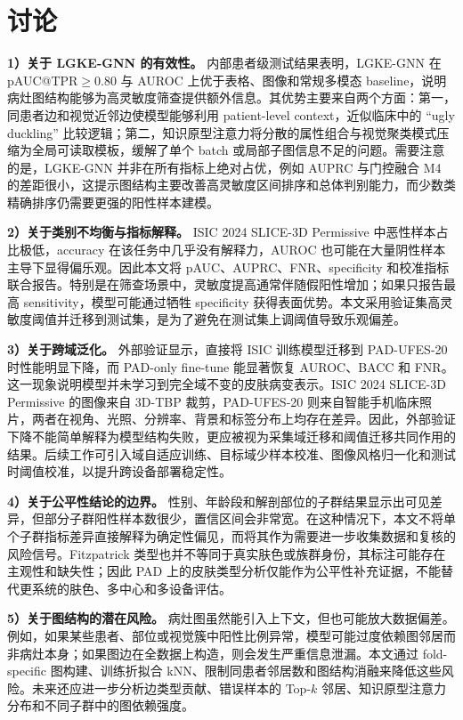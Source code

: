 \documentclass[UTF8,a4paper,10pt,twocolumn,fontset=fandol]{ctexart}
\newcommand{\isic}{ISIC 2024 SLICE-3D Permissive}
\newcommand{\pad}{PAD-UFES-20}
\newcommand{\modelname}{LGKE-GNN}
\begin{document}
\section{讨论}

\textbf{1）关于 LGKE-GNN 的有效性。}
内部患者级测试结果表明，\modelname{} 在 pAUC@TPR$\geq0.80$ 与 AUROC 上优于表格、图像和常规多模态 baseline，说明病灶图结构能够为高灵敏度筛查提供额外信息。其优势主要来自两个方面：第一，同患者边和视觉近邻边使模型能够利用 patient-level context，近似临床中的 ``ugly duckling'' 比较逻辑；第二，知识原型注意力将分散的属性组合与视觉聚类模式压缩为全局可读取模板，缓解了单个 batch 或局部子图信息不足的问题。需要注意的是，\modelname{} 并非在所有指标上绝对占优，例如 AUPRC 与门控融合 M4 的差距很小，这提示图结构主要改善高灵敏度区间排序和总体判别能力，而少数类精确排序仍需要更强的阳性样本建模。

\textbf{2）关于类别不均衡与指标解释。}
\isic{} 中恶性样本占比极低，accuracy 在该任务中几乎没有解释力，AUROC 也可能在大量阴性样本主导下显得偏乐观。因此本文将 pAUC、AUPRC、FNR、specificity 和校准指标联合报告。特别是在筛查场景中，灵敏度提高通常伴随假阳性增加；如果只报告最高 sensitivity，模型可能通过牺牲 specificity 获得表面优势。本文采用验证集高灵敏度阈值并迁移到测试集，是为了避免在测试集上调阈值导致乐观偏差。

\textbf{3）关于跨域泛化。}
外部验证显示，直接将 ISIC 训练模型迁移到 \pad{} 时性能明显下降，而 PAD-only fine-tune 能显著恢复 AUROC、BACC 和 FNR。这一现象说明模型并未学习到完全域不变的皮肤病变表示。\isic{} 的图像来自 3D-TBP 裁剪，\pad{} 则来自智能手机临床照片，两者在视角、光照、分辨率、背景和标签分布上均存在差异。因此，外部验证下降不能简单解释为模型结构失败，更应被视为采集域迁移和阈值迁移共同作用的结果。后续工作可引入域自适应训练、目标域少样本校准、图像风格归一化和测试时阈值校准，以提升跨设备部署稳定性。

\textbf{4）关于公平性结论的边界。}
性别、年龄段和解剖部位的子群结果显示出可见差异，但部分子群阳性样本数很少，置信区间会非常宽。在这种情况下，本文不将单个子群指标差异直接解释为确定性偏见，而将其作为需要进一步收集数据和复核的风险信号。Fitzpatrick 类型也并不等同于真实肤色或族群身份，其标注可能存在主观性和缺失性；因此 PAD 上的皮肤类型分析仅能作为公平性补充证据，不能替代更系统的肤色、多中心和多设备评估。

\textbf{5）关于图结构的潜在风险。}
病灶图虽然能引入上下文，但也可能放大数据偏差。例如，如果某些患者、部位或视觉簇中阳性比例异常，模型可能过度依赖图邻居而非病灶本身；如果图边在全数据上构造，则会发生严重信息泄漏。本文通过 fold-specific 图构建、训练折拟合 kNN、限制同患者邻居数和图结构消融来降低这些风险。未来还应进一步分析边类型贡献、错误样本的 Top-$k$ 邻居、知识原型注意力分布和不同子群中的图依赖强度。
\end{document}
